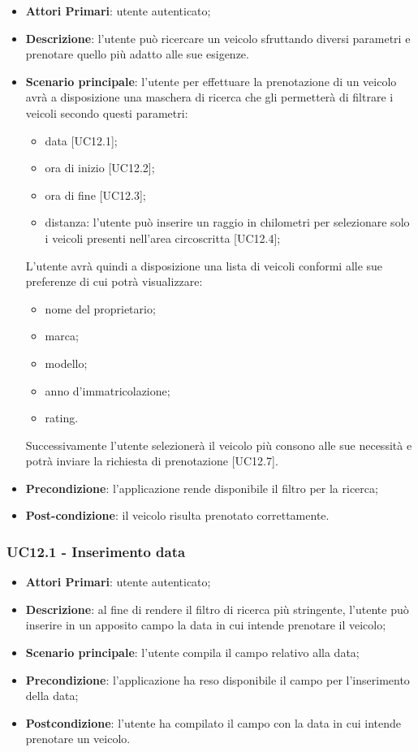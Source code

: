 \begin{itemize}
	\item \textbf{Attori Primari}: utente autenticato;
	\item \textbf{Descrizione}: l'utente può ricercare un veicolo sfruttando diversi parametri e prenotare quello più adatto alle sue esigenze.
	\item \textbf{Scenario principale}: l'utente per effettuare la prenotazione di un veicolo avrà a disposizione una maschera di ricerca che gli permetterà di filtrare i veicoli secondo questi parametri:
	\begin{itemize}
		\item data [UC12.1];
		\item ora di inizio [UC12.2];
		\item ora di fine [UC12.3];
		\item distanza: l'utente può inserire un raggio in chilometri per selezionare solo i veicoli presenti nell'area circoscritta [UC12.4]; 
	\end{itemize}
	L'utente avrà quindi a disposizione una lista di veicoli conformi alle sue preferenze di cui potrà visualizzare:
	\begin{itemize}		
		\item nome del proprietario;
		\item marca;
		\item modello;
		\item anno d'immatricolazione;
		\item rating.
	\end{itemize}
	Successivamente l'utente selezionerà il veicolo più consono alle sue necessità e potrà inviare la richiesta di prenotazione [UC12.7].
	\item \textbf{Precondizione}: l'applicazione rende disponibile il filtro per la ricerca;
	\item \textbf{Post-condizione}: il veicolo risulta prenotato correttamente.
\end{itemize} 
\subsubsection{UC12.1 - Inserimento data}
\begin{itemize}
	\item \textbf{Attori Primari}: utente autenticato;
	\item \textbf{Descrizione}: al fine di rendere il filtro di ricerca più stringente, l'utente può inserire in un apposito campo la data in cui intende prenotare il veicolo;
	\item \textbf{Scenario principale}: l'utente compila il campo relativo alla data;	
	\item \textbf{Precondizione}: l'applicazione ha reso disponibile il campo per l'inserimento della data;
	\item \textbf{Postcondizione}: l'utente ha compilato il campo con la data in cui intende prenotare un veicolo.	
\end{itemize}
